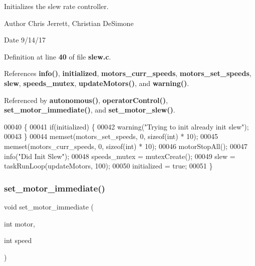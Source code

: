 Initializes the slew rate controller. 

\begin{DoxyAuthor}{Author}
Chris Jerrett, Christian De\+Simone 
\end{DoxyAuthor}
\begin{DoxyDate}{Date}
9/14/17 
\end{DoxyDate}


Definition at line \textbf{ 40} of file \textbf{ slew.\+c}.



References \textbf{ info()}, \textbf{ initialized}, \textbf{ motors\+\_\+curr\+\_\+speeds}, \textbf{ motors\+\_\+set\+\_\+speeds}, \textbf{ slew}, \textbf{ speeds\+\_\+mutex}, \textbf{ update\+Motors()}, and \textbf{ warning()}.



Referenced by \textbf{ autonomous()}, \textbf{ operator\+Control()}, \textbf{ set\+\_\+motor\+\_\+immediate()}, and \textbf{ set\+\_\+motor\+\_\+slew()}.


\begin{DoxyCode}
00040                 \{
00041   \textcolor{keywordflow}{if}(initialized) \{
00042     warning(\textcolor{stringliteral}{"Trying to init already init slew"});
00043   \}
00044   memset(motors_set_speeds, 0, \textcolor{keyword}{sizeof}(\textcolor{keywordtype}{int}) * 10);
00045   memset(motors_curr_speeds, 0, \textcolor{keyword}{sizeof}(\textcolor{keywordtype}{int}) * 10);
00046   motorStopAll();
00047   info(\textcolor{stringliteral}{"Did Init Slew"});
00048   speeds_mutex = mutexCreate();
00049   slew = taskRunLoop(updateMotors, 100);
00050   initialized = \textcolor{keyword}{true};
00051 \}
\end{DoxyCode}
\mbox{\label{slew_8c_a9f8b8ae577ef938622024545711f0151}} 
\subsubsection{set\+\_\+motor\+\_\+immediate()}
{\footnotesize\ttfamily void set\+\_\+motor\+\_\+immediate (\begin{DoxyParamCaption}\item[{int}]{motor,  }\item[{int}]{speed }\end{DoxyParamCaption})}



